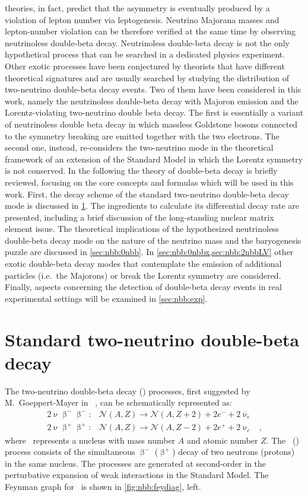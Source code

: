 theories, in fact, predict that the asymmetry is eventually produced by a violation of
lepton number via leptogenesis. Neutrino Majorana masses and lepton-number violation can
be therefore verified at the same time by observing neutrinoless double-beta decay.
\newpar
Neutrinoless double-beta decay is not the only hypothetical process that can be searched
in a dedicated physics experiment. Other exotic processes have been conjectured by
theorists that have different theoretical signatures and are usually searched by studying
the distribution of two-neutrino double-beta decay events. Two of them have been
considered in this work, namely the neutrinoless double-beta decay with Majoron emission
and the Lorentz-violating two-neutrino double beta decay. The first is essentially a
variant of neutrinoless double beta decay in which massless Goldstone bosons connected to
the symmetry breaking are emitted together with the two electrons. The second one,
instead, re-considers the two-neutrino mode in the theoretical framework of an extension
of the Standard Model in which the Lorentz symmetry is not conserved.
\newpar
In the following the theory of double-beta decay is briefly reviewed, focusing on the core
concepts and formulas which will be used in this work. First, the decay scheme of the
standard two-neutrino double-beta decay mode is discussed in \cref{sec:nbb:2nbb}. The
ingredients to calculate its differential decay rate are presented, including a brief
discussion of the long-standing nuclear matrix element issue. The theoretical implications
of the hypothesized neutrinoless double-beta decay mode on the nature of the neutrino mass
and the baryogenesis puzzle are discussed in \cref{sec:nbb:0nbb}. In
\cref{sec:nbb:0nbbx,sec:nbb:2nbbLV} other exotic double-beta decay modes that contemplate
the emission of additional particles (i.e.~the Majorons) or break the Lorentz symmetry
are considered. Finally, aspects concerning the detection of double-beta decay events in
real experimental settings will be examined in \cref{sec:nbb:exp}.

\section{Standard two-neutrino double-beta decay}%
\label{sec:nbb:2nbb}

The two-neutrino double-beta decay (\nnbb) processes, first suggested by M.~Goeppert-Mayer
in ~\cite{GoeppertMayer1935}, can be schematically represented as:
\[
  \begin{array}{llr}
    2\upnu\upbeta^-\upbeta^-: &
      \mathcal{N}(A,Z) \longrightarrow \mathcal{N}(A,Z+2)+2e^-+2{\overline \upnu}_e & \\
    2\upnu\upbeta^+\upbeta^+: &
      \mathcal{N}(A,Z) \longrightarrow \mathcal{N}(A,Z-2)+2e^++2\upnu_e &,
  \end{array}
\]
where \NAZ\ represents a nucleus with mass number $A$ and atomic number $Z$. The \nnbbm\
(\nnbbp) process consists of the simultaneous $\upbeta^-$ ($\upbeta^+$) decay of two
neutrons (protons) in the same nucleus. The processes are generated at second-order in the
perturbative expansion of weak interactions in the Standard Model. The Feynman graph for
\nnbbm\ is shown in \cref{fig:nbb:feydiag}, left.

